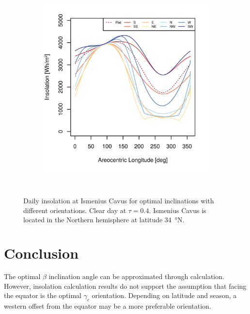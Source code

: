 \begin{figure}[h]
\begin{subfigure}[t]{\subfigureWidth}
            \includegraphics[height=\graphicsHeight]{sections/appendix/optimal-angles/plots/ismenius-cavus-tau-04-and-beta-optimal-based-on-solar-insolation.png}
            \label{fig:sub:optimal-angles-ismenius-cavus-based-on-insolation}
    \end{subfigure}\\[0.8ex]
    \caption[Daily insolation at Ismenius Cavus for optimal inclinations with different orientations]
    {Daily insolation at Ismenius Cavus for optimal inclinations with different orientations. Clear day at $\tau=0.4$. Ismenius Cavus is located in the Northern hemisphere at latitude \SI{34}{\degree}N.}
    \label{fig:plot:optimal-angles-ismenius-cavus}
\vspace{-2ex}
\end{figure}

\section{Conclusion}
The optimal $\beta$ inclination angle can be approximated through calculation. However, insolation calculation results do not support the assumption that facing the equator is the optimal $\gamma_c$ orientation. Depending on latitude and season, a western offset from the equator may be a more preferable orientation.
